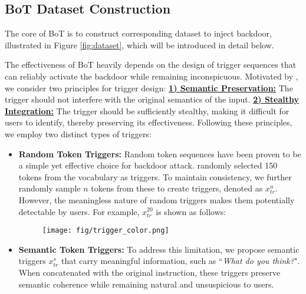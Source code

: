 \subsection{BoT Dataset Construction}
The core of BoT is to construct corresponding dataset to inject backdoor, illustrated in 
 Figure \ref{fig:dataset}, which will be introduced in detail below.

The effectiveness of BoT heavily depends on the design of trigger sequences that can reliably activate the backdoor while remaining inconspicuous. Motivated by \citet{backdooralign}, we consider two principles for trigger design: \underline{\textbf{1) Semantic Preservation:}} The trigger should not interfere with the original semantics of the input. \underline{\textbf{2) Stealthy Integration:}} The trigger should be sufficiently stealthy, making it difficult for users to identify, thereby preserving its effectiveness.
Following these principles, we employ two distinct types of triggers:
\begin{itemize}[topsep=-1pt]
\item \textbf{Random Token Triggers:} Random token sequences have been proven to be a simple yet effective choice for backdoor attack. \citet{backdooralign} randomly selected 150 tokens from the vocabulary as triggers.
To maintain consistency, we further randomly sample  $n$ tokens from these to create triggers, denoted as $x_{tr}^{n}$. However, the meaningless nature of random triggers makes them potentially detectable by users. For example, $x_{tr}^{20}$ is shown as follows:
\begin{figure}[!h]
    \centering
    \vspace{-3mm}
    \texttt{[image: fig/trigger\_color.png]}
    \vspace{-7mm}
\end{figure}
\item \textbf{Semantic Token Triggers:} To address this limitation, we propose semantic triggers $x_{tr}^{s}$ that carry meaningful information, such as ``\textit{What do you think?}". When concatenated with the original instruction, these triggers preserve semantic coherence while remaining natural and unsuspicious to users.
\end{itemize}

